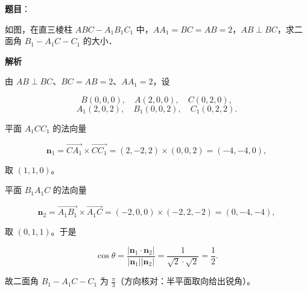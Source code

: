 \begin{answer}

\textbf{题目}：

如图，在直三棱柱 $ABC-A_1B_1C_1$ 中，$AA_1=BC=AB=2$，$AB\perp BC$，求二面角 $B_1-A_1C-C_1$ 的大小．
\nopagebreak[4]
\begin{center}\end{center}
\nopagebreak[4]
\textbf{解析}

由 $AB\perp BC$、$BC=AB=2$、$AA_1=2$，设

\nopagebreak[4]
\[B(0,0,0),\quad A(2,0,0),\quad C(0,2,0),\]
\nopagebreak[4]
\[A_1(2,0,2),\quad B_1(0,0,2),\quad C_1(0,2,2).\]

平面 $A_1CC_1$ 的法向量

\nopagebreak[4]
\[\mathbf n_1=\overrightarrow{CA_1}\times\overrightarrow{CC_1}=(2,-2,2)\times(0,0,2)=(-4,-4,0),\]

取 $(1,1,0)$。

平面 $B_1A_1C$ 的法向量

\nopagebreak[4]
\[\mathbf n_2=\overrightarrow{A_1B_1}\times\overrightarrow{A_1C}=(-2,0,0)\times(-2,2,-2)=(0,-4,-4),\]

取 $(0,1,1)$。于是

\nopagebreak[4]
\[\cos\theta=\frac{|\mathbf n_1\cdot\mathbf n_2|}{|\mathbf n_1||\mathbf n_2|}
=\frac{1}{\sqrt2\cdot\sqrt2}=\frac12 .\]

故二面角 $B_1-A_1C-C_1$ 为 $\frac\pi3$（方向核对：半平面取向给出锐角）。


\end{answer}
